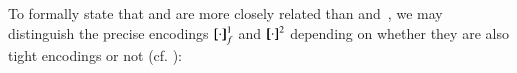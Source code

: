 \documentclass[preprint,11pt]{elsarticle}
\newtheorem{definition}{Definition}[section]
\begin{document}
{%
%
%
%				
%

To  formally state that 
\HOp and \HO are more closely related than \HOp and~\sessp,
we may 
distinguish the precise encodings $[\!\![\cdot]\!\!]_f^1$ and $[\!\![\cdot]\!\!]^2$ depending on whether they are also tight encodings or not (cf. ):

}
\end{document}
